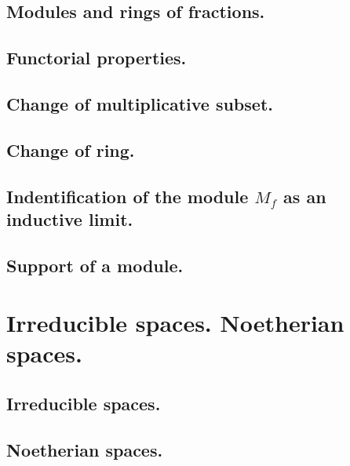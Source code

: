 \documentclass[10pt,oneside]{amsart}
\begin{document}
        \subsection{Modules and rings of fractions.}
        

        \subsection{Functorial properties.}
        

        \subsection{Change of multiplicative subset.}
        

        \subsection{Change of ring.}
        

        \subsection{Indentification of the module $M_f$ as an inductive limit.}
        

        \subsection{Support of a module.}
        

    \section{Irreducible spaces. Noetherian spaces.}

        \subsection{Irreducible spaces.}
        

        \subsection{Noetherian spaces.}
        
\end{document}
